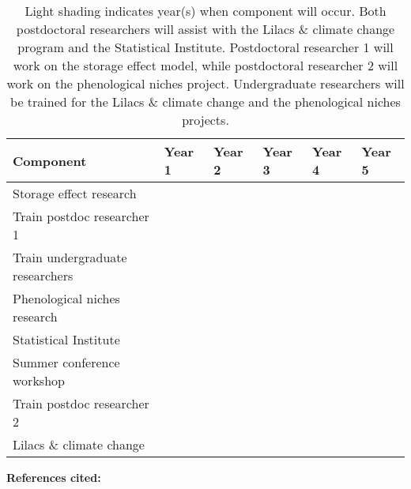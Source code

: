 \documentclass[12pt,a4paper,oneside]{article}
\begin{document}
\begin{center}
\begin{table}[h!]
\caption{Light shading indicates year(s) when component will occur. Both postdoctoral researchers will assist with the Lilacs \& climate change program and the Statistical Institute. Postdoctoral researcher 1 will work on the storage effect model, while postdoctoral researcher 2 will work on the phenological niches project. Undergraduate researchers will be trained for the Lilacs \& climate change and the phenological niches projects.}
\begin{tabular}{ | p{7cm} |  p{1.2 cm} | p{1.2 cm} | p{1.2 cm} | p{1.2 cm} | p{1.2 cm} | }  
\hline 
Component & Year 1 & Year 2 & Year 3 & Year 4 & Year 5 \\ \hline \hline
Storage effect research &  \cellcolor{blue!35} &\cellcolor{blue!35}  &\cellcolor{blue!35}   &  & \\ \hline
Train postdoc researcher 1  &  & \cellcolor{blue!35} & \cellcolor{blue!35}  &  & \\ \hline
Train undergraduate researchers &  &  \cellcolor{blue!35} &   \cellcolor{blue!35} &   \cellcolor{blue!35}&   \cellcolor{blue!35} \\ \hline
Phenological niches research &  &\cellcolor{blue!35} & \cellcolor{blue!35} & \cellcolor{blue!35} & \\ \hline
Statistical Institute &  & &   \cellcolor{blue!35} &  \cellcolor{blue!35} & \\ \hline
Summer conference workshop &  & & \cellcolor{blue!35}  &  & \cellcolor{blue!35}  \\ \hline
Train postdoc researcher 2 &  & &  &  \cellcolor{blue!35} &  \cellcolor{blue!35}\\ \hline
Lilacs \& climate change &  & \cellcolor{blue!35}&  \cellcolor{blue!35} &   \cellcolor{blue!35} & \\ \hline \hline
\end{tabular}
\end{table}
\end{center}

\clearpage
{\bf References cited:}
{\def\section*#1{}

}
\end{document}
